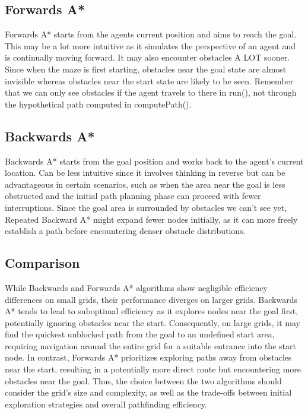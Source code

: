 \documentclass{article}
\begin{document}
\subsection{Forwards A*}
Forwards A* starts from the agents current position and aims to reach the goal. This may be a lot more intuitive as it simulates the perspective of an agent and is continually moving forward. It may also encounter obstacles A LOT sooner. Since when the maze is first starting, obstacles near the goal state are almost invisible whereas obstacles near the start state are likely to be seen. Remember that we can only see obstacles if the agent travels to there in run(), not through the hypothetical path computed in computePath(). 

\subsection{Backwards A*}
Backwards A* starts from the goal position and works back to the agent's current location. Can be less intuitive since it involves thinking in reverse but can be advantageous in certain scenarios, such as when the area near the goal is less obstructed and the initial path planning phase can proceed with fewer interruptions. Since the goal area is surrounded by obstacles we can't see yet, Repeated Backward A* might expand fewer nodes initially, as it can more freely establish a path before encountering denser obstacle distributions. 

\subsection{Comparison}
While Backwards and Forwards A* algorithms show negligible efficiency differences on small grids, their performance diverges on larger grids. Backwards A* tends to lead to suboptimal efficiency as it explores nodes near the goal first, potentially ignoring obstacles near the start. Consequently, on large grids, it may find the quickest unblocked path from the goal to an undefined start area, requiring navigation around the entire grid for a suitable entrance into the start node. In contrast, Forwards A* prioritizes exploring paths away from obstacles near the start, resulting in a potentially more direct route but encountering more obstacles near the goal. Thus, the choice between the two algorithms should consider the grid's size and complexity, as well as the trade-offs between initial exploration strategies and overall pathfinding efficiency.
\end{document}
